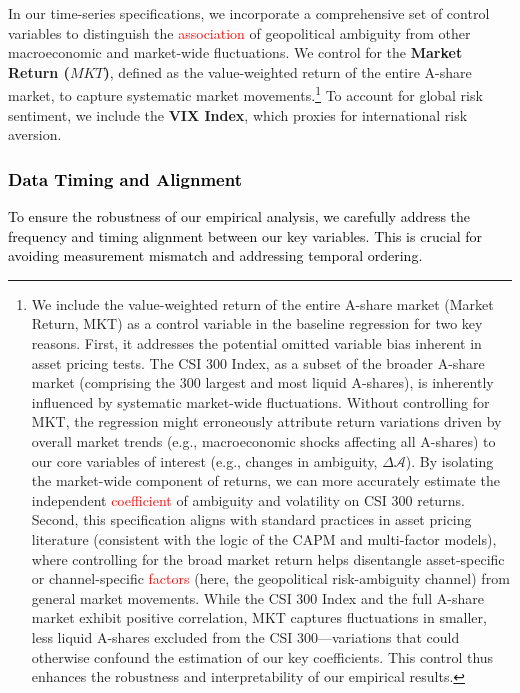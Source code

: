 \documentclass[preprint,12pt,authoryear]{elsarticle}
\begin{document}
In our time-series specifications, we incorporate a comprehensive set of control variables to distinguish the \textcolor{red}{association} of geopolitical ambiguity from other macroeconomic and market-wide fluctuations. We control for the \textbf{Market Return ($MKT$)}, defined as the value-weighted return of the entire A-share market, to capture systematic market movements.\footnote{We include the value-weighted return of the entire A-share market (Market Return, MKT) as a control variable in the baseline regression for two key reasons. First, it addresses the potential omitted variable bias inherent in asset pricing tests. The CSI 300 Index, as a subset of the broader A-share market (comprising the 300 largest and most liquid A-shares), is inherently influenced by systematic market-wide fluctuations. Without controlling for MKT, the regression might erroneously attribute return variations driven by overall market trends (e.g., macroeconomic shocks affecting all A-shares) to our core variables of interest (e.g., changes in ambiguity, $\Delta\mathcal{A}$). By isolating the market-wide component of returns, we can more accurately estimate the independent \textcolor{red}{coefficient} of ambiguity and volatility on CSI 300 returns. Second, this specification aligns with standard practices in asset pricing literature (consistent with the logic of the CAPM and multi-factor models), where controlling for the broad market return helps disentangle asset-specific or channel-specific \textcolor{red}{factors} (here, the geopolitical risk-ambiguity channel) from general market movements. While the CSI 300 Index and the full A-share market exhibit positive correlation, MKT captures fluctuations in smaller, less liquid A-shares excluded from the CSI 300—variations that could otherwise confound the estimation of our key coefficients. This control thus enhances the robustness and interpretability of our empirical results.} To account for global risk sentiment, we include the \textbf{VIX Index}, which proxies for international risk aversion.

\subsubsection{\textcolor{black}{Data Timing and Alignment}}
\textcolor{black}{To ensure the robustness of our empirical analysis, we carefully address the frequency and timing alignment between our key variables. This is crucial for avoiding measurement mismatch and addressing temporal ordering.}
\end{document}
